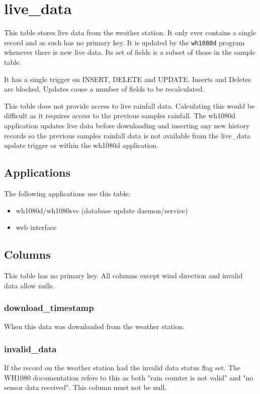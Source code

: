 \documentclass[a4paper,10pt]{book}
\begin{document}
\section{live\_data}
This table stores live data from the weather station. It only ever contains a single record and as such has no primary key. It is updated by the \verb|wh1080d| program whenever there is new live data. Its set of fields is a subset of those in the sample table.

It has a single trigger on INSERT, DELETE and UPDATE. Inserts and Deletes are blocked, Updates cause a number of fields to be recalculated.

This table does not provide access to live rainfall data. Calculating this would be difficult as it requires access to the previous samples rainfall. The wh1080d application updates live data before downloading and inserting any new history records so the previous samples rainfall data is not available from the live\_data update trigger or within the wh1080d application.

\subsection{Applications}
The following applications use this table:
\begin{itemize}
\item wh1080d/wh1080svc (database update daemon/service)
\item web interface
\end{itemize}

\subsection{Columns}
This table has no primary key. All columns except wind direction and invalid data allow nulls.

\subsubsection{download\_timestamp}
When this data was downloaded from the weather station.

\subsubsection{invalid\_data}
If the record on the weather station had the invalid data status flag set. The WH1080 documentation refers to this as both "rain counter is not valid" and "no sensor data received". This column must not be null.
\end{document}
